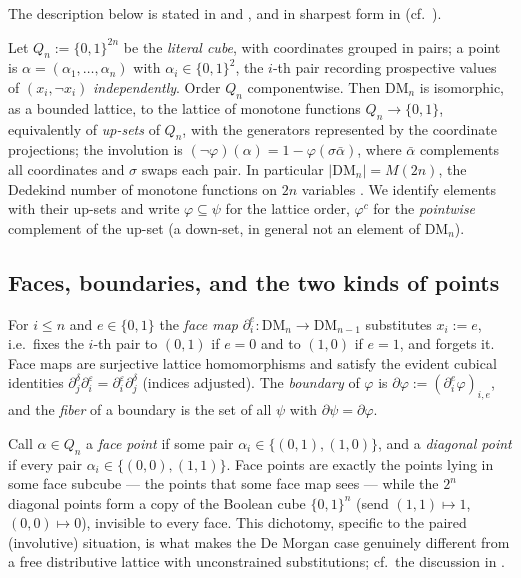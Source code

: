 \documentclass[11pt]{amsart}
\theoremstyle{definition}
\newcommand{\DM}{\mathrm{DM}}
\newcommand{\lc}{Q}                       %
\newcommand{\bnd}{\partial}
\begin{document}
The description below is stated in
\cite[Ch.~XI]{BalbesDwinger} and \cite{GWW}, and in sharpest form in
\cite[Thm.~3.2, Cor.~2.5]{MAfree} (cf.\ \cite{MA}).

Let $\lc_n := \{0,1\}^{2n}$ be the \emph{literal cube}, with
coordinates grouped in pairs; a point is
$\alpha = (\alpha_1, \dots, \alpha_n)$ with
$\alpha_i \in \{0,1\}^2$, the $i$-th pair recording prospective
values of $(x_i, \neg x_i)$ \emph{independently}.  Order $\lc_n$
componentwise.  Then $\DM_n$ is isomorphic, as a bounded lattice, to
the lattice of monotone functions $\lc_n \to \{0,1\}$, equivalently
of \emph{up-sets} of $\lc_n$, with the generators represented by the
coordinate projections; the involution is
$(\neg\varphi)(\alpha) = 1 - \varphi(\sigma\bar\alpha)$, where
$\bar\alpha$ complements all coordinates and $\sigma$ swaps each
pair.  In particular $|\DM_n| = M(2n)$, the Dedekind number of
monotone functions on $2n$ variables \cite{OEIS-Dedekind,DCM}.  We
identify elements with their up-sets and write $\varphi \subseteq
\psi$ for the lattice order, $\varphi^c$ for the \emph{pointwise}
complement of the up-set (a down-set, in general not an element of
$\DM_n$).

\subsection{Faces, boundaries, and the two kinds of points}

For $i \le n$ and $e \in \{0,1\}$ the \emph{face map}
$\bnd_i^e : \DM_n \to \DM_{n-1}$ substitutes $x_i := e$, i.e.\ fixes
the $i$-th pair to $(0,1)$ if $e = 0$ and to $(1,0)$ if $e = 1$, and
forgets it.  Face maps are surjective lattice homomorphisms and
satisfy the evident cubical identities
$\bnd_j^\delta \bnd_i^\varepsilon = \bnd_i^\varepsilon \bnd_j^\delta$
(indices adjusted).  The \emph{boundary} of $\varphi$ is
$\bnd\varphi := (\bnd_i^e\varphi)_{i,e}$, and the \emph{fiber} of a
boundary is the set of all $\psi$ with $\bnd\psi = \bnd\varphi$.

Call $\alpha \in \lc_n$ a \emph{face point} if some pair
$\alpha_i \in \{(0,1), (1,0)\}$, and a \emph{diagonal point} if every
pair $\alpha_i \in \{(0,0), (1,1)\}$.  Face points are exactly the
points lying in some face subcube --- the points that some face map
sees --- while the $2^n$ diagonal points form a copy of the Boolean
cube $\{0,1\}^n$ (send $(1,1) \mapsto 1$, $(0,0) \mapsto 0$),
invisible to every face.  This dichotomy, specific to the paired
(involutive) situation, is what makes the De Morgan case genuinely
different from a free distributive lattice with unconstrained
substitutions; cf.\ the discussion in \cite{DCM}.
\end{document}
